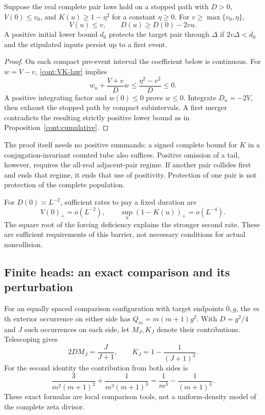 \begin{theorem}
\label{cont:barrier}
Suppose the real complete pair laws hold on a stopped path with $D>0$,
$V(0)\le v_0$, and $K(u)\ge1-\eta^2$ for a constant $\eta\ge0$.
For $v\ge\max\{v_0,\eta\}$,
\begin{equation}
 V(u)\le v,\qquad D(u)\ge D(0)-2vu.
 \label{cont:barrier-bound}
\end{equation}
A positive initial lower bound $d_0$ protects the target pair through
$\Delta$ if $2v\Delta<d_0$ and the stipulated inputs persist up to
a first event.
\end{theorem}

\begin{proof}
On each compact pre-event interval the coefficient below is continuous.
For $w=V-v$, \eqref{cont:VK-law} implies
\[
 w_u+\frac{V+v}{D}w
 \le\frac{\eta^2-v^2}{D}\le0.
\]
A positive integrating factor and $w(0)\le0$ prove $w\le0$.
Integrate $D_u=-2V$, then exhaust the stopped path by compact
subintervals. A first merger contradicts the resulting strictly positive
lower bound as in Proposition~\ref{cont:cumulative}.
\end{proof}

The proof itself needs no positive summands: a signed complete bound
for $K$ in a conjugation-invariant counted tube also suffices. Positive
omission of a tail, however, requires the all-real adjacent-pair regime.
If another pair collides first and ends that regime, it ends that use of
positivity. Protection of one pair is not protection of the complete
population.

For $D(0)\asymp L^{-2}$, sufficient rates to pay a fixed duration are
\begin{equation}
 V(0)_+=o(L^{-2}),\qquad
 \sup_u(1-K(u))_+=o(L^{-4}).
 \label{cont:rates}
\end{equation}
The square root of the forcing deficiency explains the stronger second
rate. These are sufficient requirements of this barrier, not necessary
conditions for actual noncollision.

\subsection{Finite heads: an exact comparison and its perturbation}

For an equally spaced comparison configuration with target endpoints
$0,g$, the $m$th exterior occurrence on either side has
$Q_m=m(m+1)g^2$. With $D=g^2/4$ and $J$ such occurrences on each side,
let $M_J,K_J$ denote their contributions. Telescoping gives
\begin{equation}
 2DM_J=\frac{J}{J+1},\qquad
 K_J=1-\frac1{(J+1)^3}.
 \label{cont:lattice-head}
\end{equation}
For the second identity the contribution from both sides is
\[
 \frac3{m^2(m+1)^2}+\frac1{m^3(m+1)^3}
   =\frac1{m^3}-\frac1{(m+1)^3}.
\]
These exact formulas are local comparison tools, not a uniform-density
model of the complete zeta divisor.

